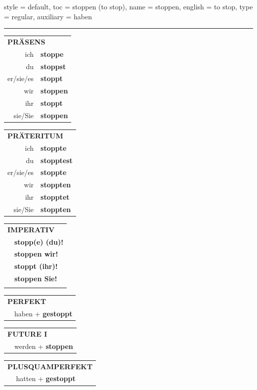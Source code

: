 \begin{verbentry}{
  style = {default},
  toc = {stoppen (to stop)},
  name = {stoppen},
  english = {to stop},
  type = {regular},
  auxiliary = {haben}
}
 
    
     \vspace{5pt}

    \hrule
    
    \vspace{5pt}

  \begin{tabular}{rl}
     \multicolumn{2}{l}{\textbf{PRÄSENS} }\\
    ich & \textbf{stoppe}\\
    du & \textbf{stoppst}\\
    er/sie/es & \textbf{stoppt}\\
    wir & \textbf{stoppen}\\
    ihr & \textbf{stoppt}\\
    sie/Sie & \textbf{stoppen}\\
  \end{tabular}
  \hfill
     \begin{tabular}{rl}
    \multicolumn{2}{l}{\textbf{PRÄTERITUM} }\\
    ich & \textbf{stoppte}\\
    du & \textbf{stopptest}\\
    er/sie/es & \textbf{stoppte}\\
    wir & \textbf{stoppten}\\
    ihr & \textbf{stopptet}\\
    sie/Sie & \textbf{stoppten}\\
  \end{tabular}
  \hfill
  \begin{tabular}{rl}
     \multicolumn{2}{l}{\textbf{IMPERATIV} }\\
   & \textbf{stopp(e) (du)!}\\
   & \textbf{stoppen wir!}\\
   & \textbf{stoppt (ihr)!}\\
   & \textbf{stoppen Sie!}\\
   & \vspace{10pt}
  \end{tabular}

    \vspace{10pt}

 \begin{tabular}{rl}
     \multicolumn{2}{l}{\textbf{PERFEKT}}\\
   & haben + \textbf{gestoppt}\\
  \end{tabular}
\hfill
   \begin{tabular}{rl}
    \multicolumn{2}{l}{\textbf{FUTURE I} }\\
   & werden + \textbf{stoppen}\\
  \end{tabular}
\hfill
   \begin{tabular}{rl}
      \multicolumn{2}{l}{\textbf{PLUSQUAMPERFEKT}}\\
   & hatten + \textbf{gestoppt}\\
  \end{tabular}


\end{verbentry}
